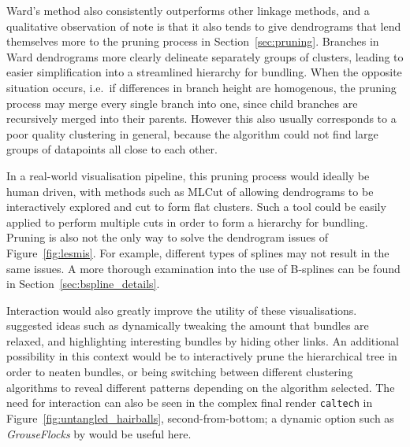 Ward's method also consistently outperforms other linkage methods, and a qualitative observation of note is that it also tends to give dendrograms that lend themselves more to the pruning process in Section~\ref{sec:pruning}. Branches in Ward dendrograms more clearly delineate separately groups of clusters, leading to easier simplification into a streamlined hierarchy for bundling.
When the opposite situation occurs, i.e.\ if differences in branch height are homogenous, the pruning process may merge every single branch into one, since child branches are recursively merged into their parents. However this also usually corresponds to a poor quality clustering in general, because the algorithm could not find large groups of datapoints all close to each other.

In a real-world visualisation pipeline, this pruning process would ideally be human driven, with methods such as MLCut of \citet{Vogogias2016} allowing dendrograms to be interactively explored and cut to form flat clusters. Such a tool could be easily applied to perform multiple cuts in order to form a hierarchy for bundling.
Pruning is also not the only way to solve the dendrogram issues of Figure~\ref{fig:lesmis}. For example, different types of splines may not result in the same issues. A more thorough examination into the use of B-splines can be found in Section~\ref{sec:bspline_details}.

Interaction would also greatly improve the utility of these visualisations. \citet{Holten2006} suggested ideas such as dynamically tweaking the amount that bundles are relaxed, and highlighting interesting bundles by hiding other links. An additional possibility in this context would be to interactively prune the hierarchical tree in order to neaten bundles, or being switching between different clustering algorithms to reveal different patterns depending on the algorithm selected.
The need for interaction can also be seen in the complex final render \texttt{caltech} in Figure~\ref{fig:untangled_hairballs}, second-from-bottom; a dynamic option such as \emph{GrouseFlocks} by \citet{Archambault2008} would be useful here.

